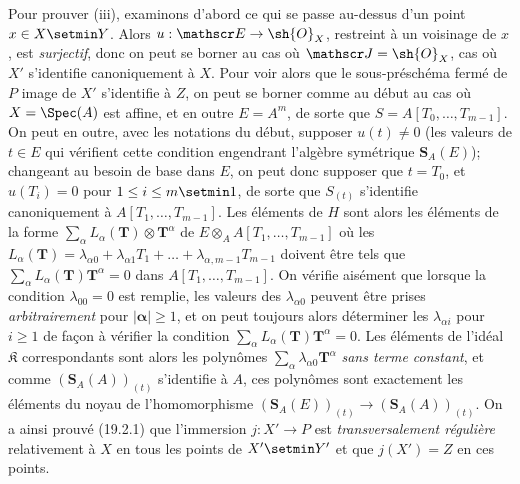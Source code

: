 Pour prouver (iii), examinons d'abord ce qui se passe au-dessus d'un point $x\in X\setmin Y$. Alors $u:\mathscr E\to\sh{O}_X$, restreint à un voisinage de $x$, est \emph{surjectif}, donc on peut se borner au cas où $\mathscr J=\sh{O}_X$, cas où $X'$ s'identifie canoniquement à $X$. Pour voir alors que le sous-préschéma fermé de $P$ image de $X'$ s'identifie à $Z$, on peut se borner comme au début au cas où $X=\Spec(A)$ est affine, et en outre $E=A^m$, de sorte que $S=A[T_0,\ldots,T_{m-1}]$. On peut en outre, avec les notations du début, supposer $u(t)\ne0$ (les valeurs de $t\in E$
qui vérifient cette condition engendrant l'algèbre symétrique $\mathbf S_A(E)$); changeant au besoin de base dans $E$, on peut donc supposer que $t=T_0$, et $u(T_i)=0$ pour $1\leq i\leq m\setmin 1$, de sorte que $S_{(t)}$ s'identifie canoniquement à $A[T_1,\ldots,T_{m-1}]$. Les éléments de $H$ sont alors les éléments de la forme $\sum_\alpha L_\alpha(\mathbf T)\otimes\mathbf T^\alpha$ de $E\otimes_A A[T_1,\ldots,T_{m-1}]$ où les $L_\alpha(\mathbf T)=\lambda_{\alpha0}+\lambda_{\alpha1}T_1+\ldots+\lambda_{\alpha,m-1}T_{m-1}$ doivent être tels que $\sum_\alpha L_\alpha(\mathbf T)\mathbf T^\alpha=0$ dans $A[T_1,\ldots,T_{m-1}]$. On vérifie aisément que lorsque la condition $\lambda_{00}=0$ est remplie, les valeurs des $\lambda_{\alpha0}$ peuvent être prises \emph{arbitrairement} pour $|\boldsymbol{\alpha}|\geq1$, et on peut toujours alors déterminer les $\lambda_{\alpha i}$ pour $i\geq1$ de façon à vérifier la condition $\sum_\alpha L_\alpha(\mathbf T)\mathbf T^\alpha=0$. Les éléments de l'idéal $\mathfrak K$ correspondants sont alors les polynômes $\sum_\alpha\lambda_{\alpha0}\mathbf T^\alpha$ \emph{sans terme constant}, et comme $(\mathbf S_A(A))_{(t)}$ s'identifie à $A$, ces polynômes sont exactement les éléments du noyau de l'homomorphisme $(\mathbf S_A(E))_{(t)}\to(\mathbf S_A(A))_{(t)}$. On a ainsi prouvé (19.2.1) que l'immersion $j:X'\to P$ est \emph{transversalement régulière} relativement à $X$ en tous les points de $X'\setmin Y'$ et que $j(X')=Z$ en ces points.

